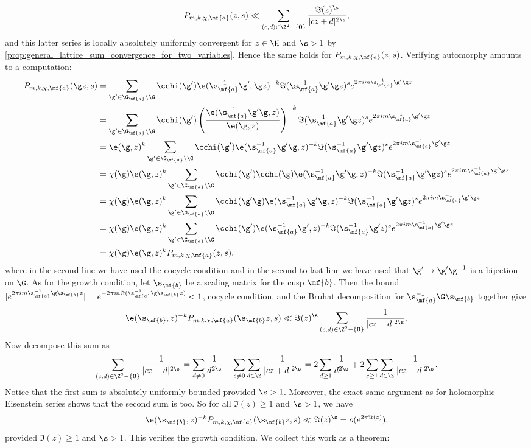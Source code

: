     \[
      P_{m,k,\chi,\mf{a}}(z,s) \ll \sum_{(c,d) \in \Z^{2}-\{\mathbf{0}\}}\frac{\Im(z)^{\s}}{|cz+d|^{2\s}},
    \]
    and this latter series is locally absolutely uniformly convergent for $z \in \H$ and $\s > 1$ by \cref{prop:general_lattice_sum_convergence_for_two_variables}. Hence the same holds for $P_{m,k,\chi,\mf{a}}(z,s)$. Verifying automorphy amounts to a computation:
    \begin{align*}
      P_{m,k,\chi,\mf{a}}(\g z,s) &= \sum_{\g' \in \G_{\mf{a}}\backslash\G}\cchi(\g')\e(\s_{\mf{a}}^{-1}\g',\g z)^{-k}\Im(\s_{\mf{a}}^{-1}\g'\g z)^{s}e^{2\pi im\s_{\mf{a}}^{-1}\g'\g z} \\
      &= \sum_{\g' \in \G_{\mf{a}}\backslash\G}\cchi(\g')\left(\frac{\e(\s_{\mf{a}}^{-1}\g'\g,z)}{\e(\g,z)}\right)^{-k}\Im(\s_{\mf{a}}^{-1}\g'\g z)^{s}e^{2\pi im\s_{\mf{a}}^{-1}\g'\g z} \\
      &= \e(\g,z)^{k}\sum_{\g' \in \G_{\mf{a}}\backslash\G}\cchi(\g')\e(\s_{\mf{a}}^{-1}\g'\g,z)^{-k}\Im(\s_{\mf{a}}^{-1}\g'\g z)^{s}e^{2\pi im\s_{\mf{a}}^{-1}\g'\g z} \\
      &= \chi(\g)\e(\g,z)^{k}\sum_{\g' \in \G_{\mf{a}}\backslash\G}\cchi(\g')\cchi(\g)\e(\s_{\mf{a}}^{-1}\g'\g,z)^{-k}\Im(\s_{\mf{a}}^{-1}\g'\g z)^{s}e^{2\pi im\s_{\mf{a}}^{-1}\g'\g z} \\
      &= \chi(\g)\e(\g,z)^{k}\sum_{\g' \in \G_{\mf{a}}\backslash\G}\cchi(\g'\g)\e(\s_{\mf{a}}^{-1}\g'\g,z)^{-k}\Im(\s_{\mf{a}}^{-1}\g'\g z)^{s}e^{2\pi im\s_{\mf{a}}^{-1}\g'\g z} \\
      &= \chi(\g)\e(\g,z)^{k}\sum_{\g' \in \G_{\mf{a}}\backslash\G}\cchi(\g')\e(\s_{\mf{a}}^{-1}\g',z)^{-k}\Im(\s_{\mf{a}}^{-1}\g' z)^{s}e^{2\pi im\s_{\mf{a}}^{-1}\g'\g z} \\
      &= \chi(\g)\e(\g,z)^{k}P_{m,k,\chi,\mf{a}}(z,s),
    \end{align*}
    where in the second line we have used the cocycle condition and in the second to last line we have used that $\g' \to \g'\g^{-1}$ is a bijection on $\G$. As for the growth condition, let $\s_{\mf{b}}$ be a scaling matrix for the cusp $\mf{b}$. Then the bound $|e^{2\pi im\s_{\mf{a}}^{-1}\g\s_{\mf{b}}z}| = e^{-2\pi m\Im(\s_{\mf{a}}^{-1}\g\s_{\mf{b}}z)} < 1$, cocycle condition, and the Bruhat decomposition for $\s_{\mf{a}}^{-1}\G\s_{\mf{b}}$ together give
    \[
      \e(\s_{\mf{b}},z)^{-k}P_{m,k,\chi,\mf{a}}(\s_{\mf{b}}z,s) \ll \Im(z)^{\s}\sum_{(c,d) \in \Z^{2}-\{\mathbf{0}\}}\frac{1}{|cz+d|^{2\s}}.
    \]
    Now decompose this sum as
    \[
      \sum_{(c,d) \in \Z^{2}-\{\mathbf{0}\}}\frac{1}{|cz+d|^{2\s}} = \sum_{d \neq 0}\frac{1}{d^{2\s}}+\sum_{c \neq 0}\sum_{d \in \Z}\frac{1}{|cz+d|^{2\s}} = 2\sum_{d \ge 1}\frac{1}{d^{2\s}}+2\sum_{c \ge 1}\sum_{d \in \Z}\frac{1}{|cz+d|^{2\s}}.
    \]
    Notice that the first sum is absolutely uniformly bounded provided $\s > 1$. Moreover, the exact same argument as for holomorphic Eisenstein series shows that the second sum is too. So for all $\Im(z) \ge 1$ and $\s > 1$, we have
    \[
      \e(\s_{\mf{b}},z)^{-k}P_{m,k,\chi,\mf{a}}(\s_{\mf{b}}z,s) \ll \Im(z)^{\s} = o(e^{2\pi\Im(z)}),
    \]
    provided $\Im(z) \ge 1$ and $\s > 1$. This verifies the growth condition. We collect this work as a theorem:

